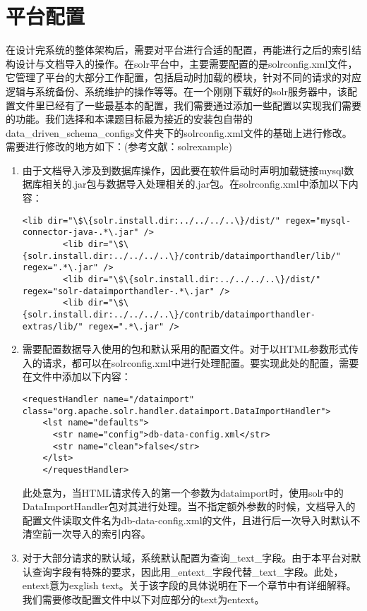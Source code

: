 \section{平台配置}
    在设计完系统的整体架构后，需要对平台进行合适的配置，再能进行之后的索引结构设计与文档导入的操作。在solr平台中，主要需要配置的是solrconfig.xml文件，它管理了平台的大部分工作配置，包括启动时加载的模块，针对不同的请求的对应逻辑与系统备份、系统维护的操作等等。在一个刚刚下载好的solr服务器中，该配置文件里已经有了一些最基本的配置，我们需要通过添加一些配置以实现我们需要的功能。我们选择和本课题目标最为接近的安装包自带的data\_driven\_schema\_configs文件夹下的solrconfig.xml文件的基础上进行修改。需要进行修改的地方如下：(参考文献：solrexample)

    \begin{enumerate}
    \item 由于文档导入涉及到数据库操作，因此要在软件启动时声明加载链接mysql数据库相关的.jar包与数据导入处理相关的.jar包。在solrconfig.xml中添加以下内容：
    \begin{lstlisting}[caption={solrconfig.xml改动1}, label=ptszi1, escapeinside="", numbers=none]
        <lib dir="\$\{solr.install.dir:../../../..\}/dist/" regex="mysql-connector-java-.*\.jar" />
        <lib dir="\$\{solr.install.dir:../../../..\}/contrib/dataimporthandler/lib/" regex=".*\.jar" />
        <lib dir="\$\{solr.install.dir:../../../..\}/dist/" regex="solr-dataimporthandler-.*\.jar" />
        <lib dir="\$\{solr.install.dir:../../../..\}/contrib/dataimporthandler-extras/lib/" regex=".*\.jar" />
    \end{lstlisting}
    \item 需要配置数据导入使用的包和默认采用的配置文件。对于以HTML参数形式传入的请求，都可以在solrconfig.xml中进行处理配置。要实现此处的配置，需要在文件中添加以下内容：
    \begin{lstlisting}[caption={solrconfig.xml改动2}, label=ptszi2, escapeinside="", numbers=none]
    <requestHandler name="/dataimport" class="org.apache.solr.handler.dataimport.DataImportHandler">
    <lst name="defaults">
      <str name="config">db-data-config.xml</str>
      <str name="clean">false</str>
    </lst>
    </requestHandler>
    \end{lstlisting}
    此处意为，当HTML请求传入的第一个参数为dataimport时，使用solr中的DataImportHandler包对其进行处理。当不指定额外参数的时候，文档导入的配置文件读取文件名为db-data-config.xml的文件，且进行后一次导入时默认不清空前一次导入的索引内容。
    \item 对于大部分请求的默认域，系统默认配置为查询\_text\_字段。由于本平台对默认查询字段有特殊的要求，因此用\_entext\_字段代替\_text\_字段。此处，entext意为exglish text。关于该字段的具体说明在下一个章节中有详细解释。我们需要修改配置文件中以下对应部分的text为entext。

\end{enumerate}
